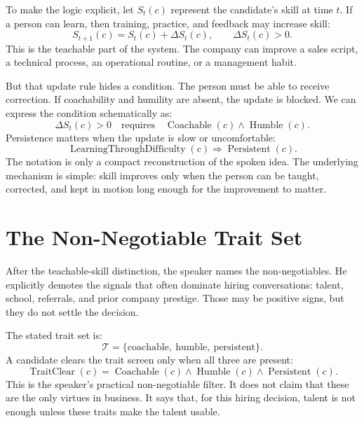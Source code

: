 To make the logic explicit, let \(S_t(c)\) represent the candidate's skill at time \(t\). If a person can learn, then training, practice, and feedback may increase skill:
\begin{equation}
  S_{t+1}(c)
  =
  S_t(c)+\Delta S_t(c),
  \qquad
  \Delta S_t(c)>0.
\end{equation}
This is the teachable part of the system. The company can improve a sales script, a technical process, an operational routine, or a management habit.

But that update rule hides a condition. The person must be able to receive correction. If coachability and humility are absent, the update is blocked. We can express the condition schematically as:
\begin{equation}
  \Delta S_t(c)>0
  \quad\text{requires}\quad
  \operatorname{Coachable}(c)
  \land
  \operatorname{Humble}(c).
\end{equation}
Persistence matters when the update is slow or uncomfortable:
\begin{equation}
  \operatorname{LearningThroughDifficulty}(c)
  \Rightarrow
  \operatorname{Persistent}(c).
\end{equation}
The notation is only a compact reconstruction of the spoken idea. The underlying mechanism is simple: skill improves only when the person can be taught, corrected, and kept in motion long enough for the improvement to matter.

\section{The Non-Negotiable Trait Set}

After the teachable-skill distinction, the speaker names the non-negotiables. He explicitly demotes the signals that often dominate hiring conversations: talent, school, referrals, and prior company prestige. Those may be positive signs, but they do not settle the decision.

The stated trait set is:
\begin{equation}
  \mathcal{T}
  =
  \{\text{coachable},\ \text{humble},\ \text{persistent}\}.
\end{equation}
A candidate clears the trait screen only when all three are present:
\begin{equation}
  \operatorname{TraitClear}(c)
  =
  \operatorname{Coachable}(c)
  \land
  \operatorname{Humble}(c)
  \land
  \operatorname{Persistent}(c).
\end{equation}
This is the speaker's practical non-negotiable filter. It does not claim that these are the only virtues in business. It says that, for this hiring decision, talent is not enough unless these traits make the talent usable.

